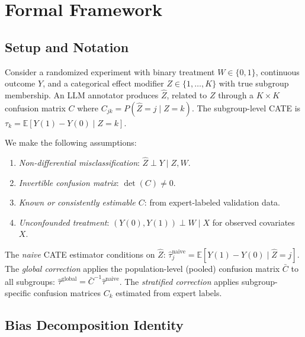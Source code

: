 \documentclass[11pt]{article}
\newcommand{\E}{\mathbb{E}}
\begin{document}
\section{Formal Framework}
\label{sec:theory}

\subsection{Setup and Notation}

Consider a randomized experiment with binary treatment $W \in \{0,1\}$, continuous outcome $Y$, and a categorical effect modifier $Z \in \{1, \ldots, K\}$ with true subgroup membership.
An LLM annotator produces $\hat{Z}$, related to $Z$ through a $K \times K$ confusion matrix $C$ where $C_{jk} = P(\hat{Z} = j \mid Z = k)$.
The subgroup-level CATE is $\tau_k = \E[Y(1) - Y(0) \mid Z = k]$.

We make the following assumptions:
\begin{enumerate}[label=\textbf{A\arabic*},nosep,leftmargin=*]
\item \emph{Non-differential misclassification}: $\hat{Z} \perp Y \mid Z, W$.
\item \emph{Invertible confusion matrix}: $\det(C) \neq 0$.
\item \emph{Known or consistently estimable $C$}: from expert-labeled validation data.
\item \emph{Unconfounded treatment}: $(Y(0), Y(1)) \perp W \mid X$ for observed covariates $X$.
\end{enumerate}

The \emph{naive} CATE estimator conditions on $\hat{Z}$: $\hat{\tau}_j^{\text{naive}} = \E[Y(1) - Y(0) \mid \hat{Z} = j]$.
The \emph{global correction} applies the population-level (pooled) confusion matrix $\bar{C}$ to all subgroups:
$\hat{\tau}^{\text{global}} = \bar{C}^{-1} \hat{\tau}^{\text{naive}}$.
The \emph{stratified correction} applies subgroup-specific confusion matrices $C_k$ estimated from expert labels.

\subsection{Bias Decomposition Identity}
\end{document}
